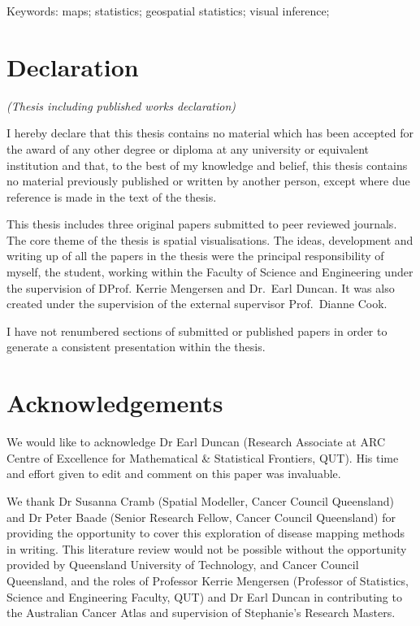 \documentclass{monashthesis}
\begin{document}
Keywords: maps; statistics; geospatial statistics; visual inference;
\newpage

\hypertarget{declaration}{%
\chapter*{Declaration}\label{declaration}}

\emph{(Thesis including published works declaration)}

I hereby declare that this thesis contains no material which has been accepted for the award of any other degree or diploma at any university or equivalent institution and that, to the best of my knowledge and belief, this thesis contains no material previously published or written by another person, except where due reference is made in the text of the thesis.

This thesis includes three original papers submitted to peer reviewed journals. The core theme of the thesis is spatial visualisations. The ideas, development and writing up of all the papers in the thesis were the principal responsibility of myself, the student, working within the Faculty of Science and Engineering under the supervision of DProf. Kerrie Mengersen and Dr.~Earl Duncan. It was also created under the supervision of the external supervisor Prof.~Dianne Cook.

I have not renumbered sections of submitted or published papers in order to generate a consistent presentation within the thesis.

\hypertarget{acknowledgements}{%
\chapter*{Acknowledgements}\label{acknowledgements}}

We would like to acknowledge Dr Earl Duncan (Research Associate at ARC Centre of Excellence for Mathematical \& Statistical Frontiers, QUT). His time and effort given to edit and comment on this paper was invaluable.

We thank Dr Susanna Cramb (Spatial Modeller, Cancer Council Queensland) and Dr Peter Baade (Senior Research Fellow, Cancer Council Queensland) for providing the opportunity to cover this exploration of disease mapping methods in writing.
This literature review would not be possible without the opportunity provided by Queensland University of Technology, and Cancer Council Queensland, and the roles of Professor Kerrie Mengersen (Professor of Statistics, Science and Engineering Faculty, QUT) and Dr Earl Duncan in contributing to the Australian Cancer Atlas and supervision of Stephanie's Research Masters.
\end{document}
